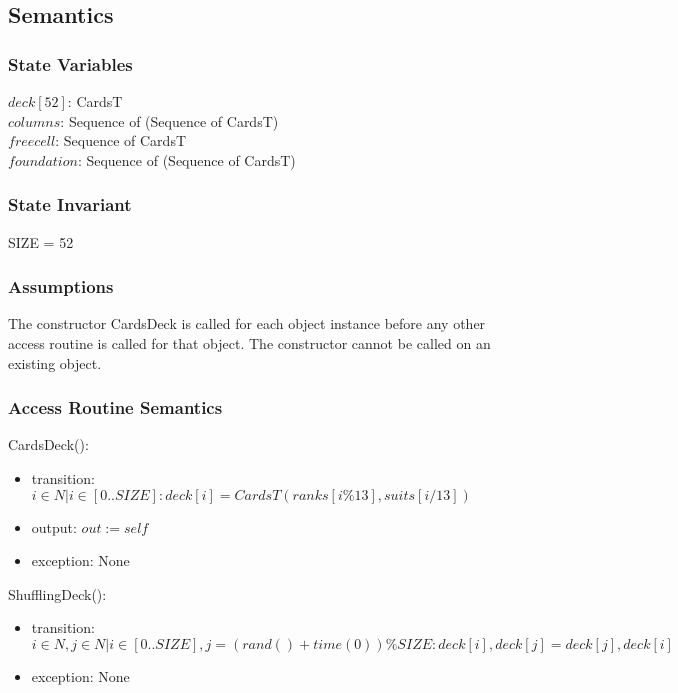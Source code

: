 \documentclass[12pt]{article}
\begin{document}
\subsection* {Semantics}

\subsubsection* {State Variables}

$deck[52]$: CardsT\\
$columns$: Sequence of (Sequence of CardsT)\\
$freecell$: Sequence of CardsT\\
$foundation$: Sequence of (Sequence of CardsT)\\

\subsubsection* {State Invariant}

SIZE = 52

\subsubsection* {Assumptions}

The constructor CardsDeck is called for each object instance before any other
access routine is called for that object.  The constructor cannot be called on
an existing object.

\subsubsection* {Access Routine Semantics}

CardsDeck():
\begin{itemize}
	\item transition: $i\in\mathit{N}|i\in[0..SIZE]:deck[i]=CardsT(ranks[i \% 13], suits[i / 13])$
	\item output: $out := \mathit{self}$
	\item exception: None
\end{itemize}

\noindent ShufflingDeck():
\begin{itemize}
	\item transition: $i\in\mathit{N},j\in\mathit{N}|i\in[0..SIZE],j = (rand() + time(0)) \% SIZE:deck[i],deck[j]=deck[j],deck[i]$
	\item exception: None
\end{itemize}
\end{document}
